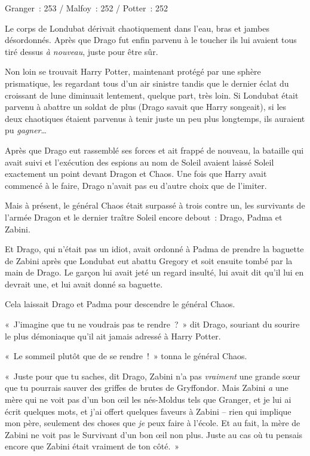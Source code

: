 \later

Granger~: 253 / Malfoy~: 252 / Potter~: 252

Le corps de Londubat dérivait chaotiquement dans l'eau, bras et jambes désordonnés.
Après que Drago fut enfin parvenu à le toucher ils lui avaient tous tiré dessus \emph{à nouveau}, juste pour être sûr.

Non loin se trouvait Harry Potter, maintenant protégé par une sphère prismatique, les regardant tous d'un air sinistre tandis que le dernier éclat du croissant de lune diminuait lentement, quelque part, très loin.
Si Londubat était parvenu à abattre un soldat de plus (Drago savait que Harry songeait), si les deux chaotiques étaient parvenus à tenir juste un peu plus longtemps, ils auraient pu \emph{gagner}…

Après que Drago eut rassemblé ses forces et ait frappé de nouveau, la bataille qui avait suivi et l'exécution des espions au nom de Soleil avaient laissé Soleil exactement un point devant Dragon et Chaos.
Une fois que Harry avait commencé à le faire, Drago n'avait pas eu d'autre choix que de l'imiter.

Mais à présent, le général Chaos était surpassé à trois contre un, les survivants de l'armée Dragon et le dernier traître Soleil encore debout~: Drago, Padma et Zabini.

Et Drago, qui n'était pas un idiot, avait ordonné à Padma de prendre la baguette de Zabini après que Londubat eut abattu Gregory et soit ensuite tombé par la main de Drago.
Le garçon lui avait jeté un regard insulté, lui avait dit qu'il lui en devrait une, et lui avait donné sa baguette.

Cela laissait Drago et Padma pour descendre le général Chaos.

«~J'imagine que tu ne voudrais pas te rendre~?~»
dit Drago, souriant du sourire le plus démoniaque qu'il ait jamais adressé à Harry Potter.

«~Le sommeil plutôt que de se rendre~!~»
tonna le général Chaos.

«~Juste pour que tu saches, dit Drago, Zabini n'a pas \emph{vraiment} une grande sœur que tu pourrais sauver des griffes de brutes de Gryffondor.
Mais Zabini \emph{a} une mère qui ne voit pas d'un bon œil les nés-Moldus tels que Granger, et je lui ai écrit quelques mots, et j'ai offert quelques faveurs à Zabini -- rien qui implique mon père, seulement des choses que \emph{je} peux faire à l'école.
Et au fait, la mère de Zabini ne voit pas le Survivant d'un bon œil non plus.
Juste au cas où tu pensais encore que Zabini était vraiment de ton côté.~»

